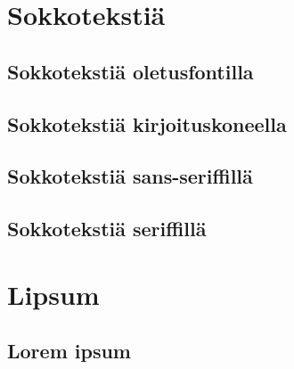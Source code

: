 

\Blinddocument

\chapter{Sokkotekstiä}

\section{Sokkotekstiä oletusfontilla}

\Blindtext

\section{Sokkotekstiä kirjoituskoneella}

\texttt{\blindtext}


\section{Sokkotekstiä sans-seriffillä}

\textsf{\blindtext}

\section{Sokkotekstiä seriffillä}

\textrm{\blindtext}




\chapter{Lipsum}


\section{Lorem ipsum}

\lipsum[1-5]

\texttt{\lipsum[6-10]}

\textsf{\lipsum[11-15]}

\textrm{\lipsum[16-20]}

